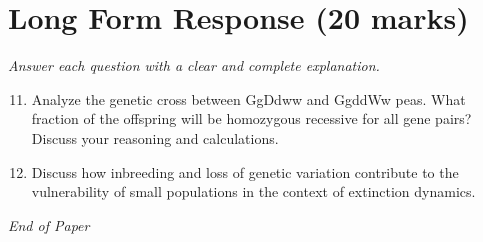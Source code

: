 \documentclass[12pt]{article}
\begin{document}
\section*{Long Form Response (20 marks)}
\textit{Answer each question with a clear and complete explanation.}
\begin{enumerate}[label=\arabic*.]
\setcounter{enumi}{10}
\item Analyze the genetic cross between GgDdww and GgddWw peas. What fraction of the offspring will be homozygous recessive for all gene pairs? Discuss your reasoning and calculations.
\item Discuss how inbreeding and loss of genetic variation contribute to the vulnerability of small populations in the context of extinction dynamics.
\end{enumerate}

\vfill
\noindent\textit{End of Paper}
\end{document}
